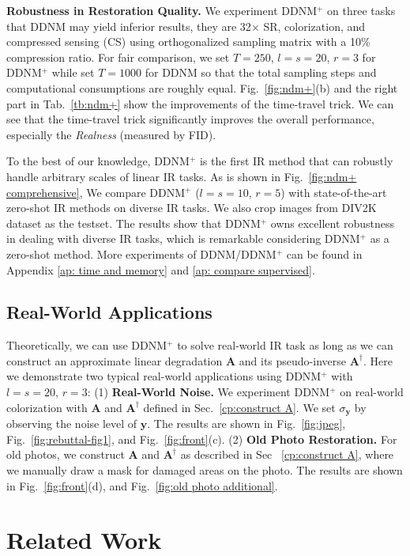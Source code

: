 \documentclass{article} \usepackage{iclr2023_conference,times}
\begin{document}
\textbf{Robustness in Restoration Quality.} We experiment DDNM$^+$ on three tasks that DDNM may yield inferior results, they are 32$\times$ SR, colorization, and compressed sensing (CS) using orthogonalized sampling matrix with a 10\% compression ratio. For fair comparison, we set $T=250$, $l=s=20$, $r=3$ for DDNM$^+$ while set $T=1000$ for DDNM so that the total sampling steps and computational consumptions are roughly equal. Fig.~\ref{fig:ndm+}(b) and the right part in Tab.~\ref{tb:ndm+} show the improvements of the time-travel trick. We can see that the time-travel trick significantly improves the overall performance, especially the \textit{Realness} (measured by FID).

To the best of our knowledge, DDNM$^+$ is the first IR method that can robustly handle arbitrary scales of linear IR tasks. As is shown in Fig.~\ref{fig:ndm+ comprehensive}, We compare DDNM$^+$ ($l=s=10$, $r=5$) with state-of-the-art zero-shot IR methods on diverse IR tasks. We also crop images from DIV2K dataset \citep{div2k} as the testset. The results show that DDNM$^+$ owns excellent robustness in dealing with diverse IR tasks, which is remarkable considering DDNM$^+$ as a zero-shot method. More experiments of DDNM/DDNM$^+$ can be found in Appendix \ref{ap: time and memory} and \ref{ap: compare supervised}.

\subsection{Real-World Applications}
Theoretically, we can use DDNM$^+$ to solve real-world IR task as long as we can construct an approximate linear degradation $\mathbf{A}$ and its pseudo-inverse $\mathbf{A}^{\dagger}$. Here we demonstrate two typical real-world applications using DDNM$^+$ with $l=s=20$, $r=3$: (1) \textbf{Real-World Noise.} We experiment DDNM$^+$ on real-world colorization with $\mathbf{A}$ and $\mathbf{A}^{\dagger}$ defined in Sec.~\ref{cp:construct A}. We set $\sigma_{\mathbf{y}}$ by observing the noise level of $\mathbf{y}$. The results are shown in Fig.~\ref{fig:jpeg}, Fig.~\ref{fig:rebuttal-fig1}, and Fig.~\ref{fig:front}(c). (2) \textbf{Old Photo Restoration.}  For old photos, we construct $\mathbf{A}$ and $\mathbf{A}^{\dagger}$ as described in Sec ~\ref{cp:construct A}, where we manually draw a mask for damaged areas on the photo. The results are shown in Fig.~\ref{fig:front}(d), and Fig.~\ref{fig:old photo additional}.



\section{Related Work}
\end{document}
